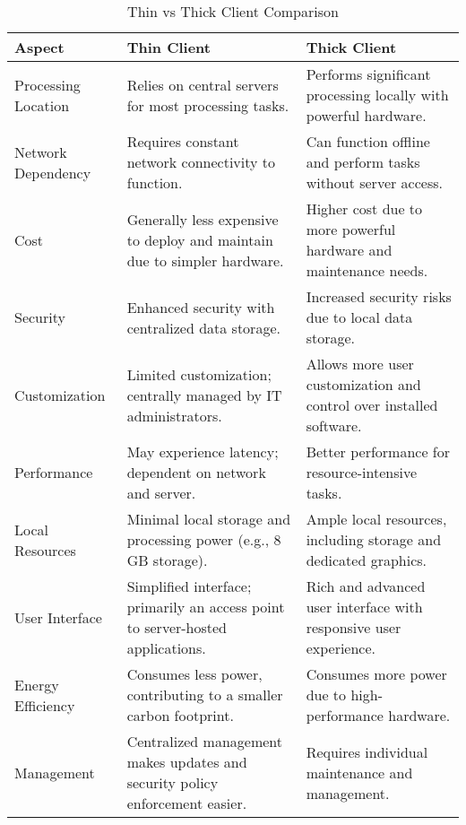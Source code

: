 \begin{table}[h]
    \centering
    \label{thin-vs-thick}
    \begin{tabularx}{\textwidth}{@{} >{\RaggedRight\arraybackslash}p{} | >{\RaggedRight\arraybackslash}X | >{\RaggedRight\arraybackslash}X @{}}
        \toprule
        Aspect & Thin Client & Thick Client \\
        \midrule %
        Processing Location & Relies on central servers for most processing tasks. & Performs significant processing locally with powerful hardware. \\
        \midrule %
        Network Dependency & Requires constant network connectivity to function. & Can function offline and perform tasks without server access. \\
        \midrule
        Cost & Generally less expensive to deploy and maintain due to simpler hardware. & Higher cost due to more powerful hardware and maintenance needs. \\
        \midrule
        Security & Enhanced security with centralized data storage. & Increased security risks due to local data storage. \\
        \midrule
        Customization & Limited customization; centrally managed by IT administrators. & Allows more user customization and control over installed software. \\
        \midrule
        Performance & May experience latency; dependent on network and server. & Better performance for resource-intensive tasks. \\
        \midrule
        Local Resources & Minimal local storage and processing power (e.g., 8 GB storage). & Ample local resources, including storage and dedicated graphics. \\
        \midrule
        User Interface & Simplified interface; primarily an access point to server-hosted applications. & Rich and advanced user interface with responsive user experience. \\
        \midrule
        Energy Efficiency & Consumes less power, contributing to a smaller carbon footprint. & Consumes more power due to high-performance hardware. \\
        \midrule
        Management & Centralized management makes updates and security policy enforcement easier. & Requires individual maintenance and management. \\
        \bottomrule %
    \end{tabularx}
    \caption{Thin vs Thick Client Comparison}
\end{table}


